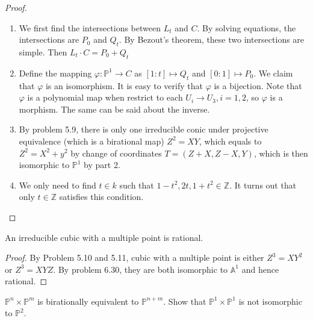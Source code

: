 \documentclass{solution}
\begin{document}
\begin{proof}
    \begin{enumerate}
        \item We first find the intersections between $L_t$ and $C$. By solving equations, the intersections are $P_0$ and $Q_t$. By Bezout's theorem, these two intersections are simple. Then $L_t \cdot C = P_0 + Q_t$
        \item Define the mapping $\varphi: \mathbb{P}^1 \rightarrow C$ as $[1:t] \mapsto Q_t$ and $[0:1] \mapsto P_0$. We claim that $\varphi$ is an isomorphism. It is easy to verify that $\varphi$ is a bijection. Note that $\varphi$ is a polynomial map when restrict to each $U_i \rightarrow U_3, i = 1, 2$, so $\varphi$ is a morphism. The same can be said about the inverse.
        \item By problem 5.9, there is only one irreducible conic under projective equivalence (which is a birational map) $Z^2 = XY$, which equals to $Z^2 = X^2 + y^2$ by change of coordinates $T = (Z + X, Z - X, Y)$, which is then isomorphic to $\mathbb{P}^1$ by part 2.
        \item We only need to find $t \in k$ such that $1 - t^2, 2t, 1 + t^2 \in \mathbb{Z}$. It turns out that only $t \in \mathbb{Z}$ satisfies this condition.
    \end{enumerate}
\end{proof}

\begin{problem}{6.38}
    An irreducible cubic with a multiple point is rational.
\end{problem}

\begin{proof}
    By Problem 5.10 and 5.11, cubic with a multiple point is either $Z^3 = XY^2$ or $Z^3 = XYZ$. By problem 6.30, they are both isomorphic to $\mathbb{A}^1$ and hence rational.
\end{proof}

\begin{problem}{6.39}
    $\mathbb{P}^n \times \mathbb{P}^m$ is birationally equivalent to $\mathbb{P}^{n + m}$. Show that $\mathbb{P}^1 \times \mathbb{P}^1$ is not isomorphic to $\mathbb{P}^2$.
\end{problem}
\end{document}
